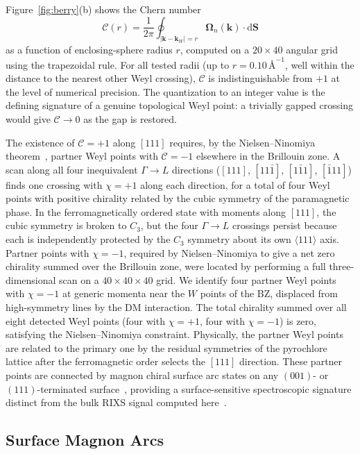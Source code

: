 \documentclass[aps,prb,twocolumn,superscriptaddress,longbibliography]{revtex4-2}
\begin{document}
Figure~\ref{fig:berry}(b) shows the Chern number
\begin{equation}
  \mathcal{C}(r) = \frac{1}{2\pi} \oint_{|\bm{k}-\bm{k}_W|=r}
    \bm{\Omega}_n(\bm{k}) \cdot \mathrm{d}\bm{S}
  \label{eq:chern}
\end{equation}
as a function of enclosing-sphere radius $r$, computed on a $20\times 40$
angular grid using the trapezoidal rule.
For all tested radii (up to $r = 0.10\,\text{\AA}^{-1}$, well within the
distance to the nearest other Weyl crossing), $\mathcal{C}$ is indistinguishable
from $+1$ at the level of numerical precision.
The quantization to an integer value is the defining signature of a genuine
topological Weyl point: a trivially gapped crossing would give
$\mathcal{C} \to 0$ as the gap is restored.

The existence of $\mathcal{C} = +1$ along $[111]$ requires, by the
Nielsen--Ninomiya theorem~\cite{Nielsen1981}, partner Weyl points with
$\mathcal{C} = -1$ elsewhere in the Brillouin zone.
A scan along all four inequivalent $\Gamma \to L$ directions
($[111]$, $[11\bar1]$, $[1\bar11]$, $[\bar111]$) finds one crossing with
$\chi = +1$ along each direction, for a total of four Weyl points with
positive chirality related by the cubic symmetry of the paramagnetic phase.
In the ferromagnetically ordered state with moments along $[111]$, the cubic
symmetry is broken to $C_3$, but the four $\Gamma \to L$ crossings persist
because each is independently protected by the $C_3$ symmetry about its own
$\langle 111 \rangle$ axis.
Partner points with $\chi = -1$, required by Nielsen--Ninomiya to give a
net zero chirality summed over the Brillouin zone, were located by performing
a full three-dimensional scan on a $40 \times 40 \times 40$ grid.
We identify four partner Weyl points with $\chi = -1$ at generic momenta
near the $W$ points of the BZ, displaced from high-symmetry lines by the
DM interaction.
The total chirality summed over all eight detected Weyl points (four with
$\chi = +1$, four with $\chi = -1$) is zero, satisfying the
Nielsen--Ninomiya constraint.
Physically, the partner Weyl points are related to the primary one by the
residual symmetries of the pyrochlore lattice after the ferromagnetic order
selects the $[111]$ direction.
These partner points are connected by magnon chiral surface arc states
on any $(001)$- or $(111)$-terminated surface~\cite{Li2016,Mook2016},
providing a surface-sensitive spectroscopic signature distinct from the
bulk RIXS signal computed here~\cite{Armitage2018}.

\subsection{Surface Magnon Arcs}
\end{document}
